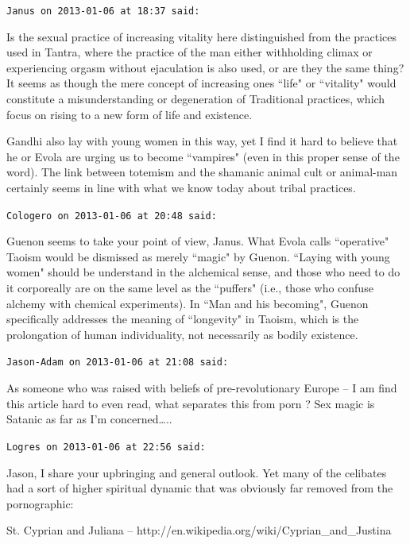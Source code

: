 \begin{footnotesize}\begin{sffamily}



\texttt{Janus on 2013-01-06 at 18:37 said: }

Is the sexual practice of increasing vitality here distinguished from the practices used in Tantra, where the practice of the man either withholding climax or experiencing orgasm without ejaculation is also used, or are they the same thing? It seems as though the mere concept of increasing ones ``life" or ``vitality" would constitute a misunderstanding or degeneration of Traditional practices, which focus on rising to a new form of life and existence. 

Gandhi also lay with young women in this way, yet I find it hard to believe that he or Evola are urging us to become ``vampires" (even in this proper sense of the word). The link between totemism and the shamanic animal cult or animal-man certainly seems in line with what we know today about tribal practices.


\hfill

\texttt{Cologero on 2013-01-06 at 20:48 said: }

Guenon seems to take your point of view, Janus. What Evola calls ``operative" Taoism would be dismissed as merely ``magic" by Guenon. ``Laying with young women" should be understand in the alchemical sense, and those who need to do it corporeally are on the same level as the ``puffers" (i.e., those who confuse alchemy with chemical experiments). In ``Man and his becoming", Guenon specifically addresses the meaning of ``longevity" in Taoism, which is the prolongation of human individuality, not necessarily as bodily existence.


\hfill

\texttt{Jason-Adam on 2013-01-06 at 21:08 said: }

As someone who was raised with beliefs of pre-revolutionary Europe – I am find this article hard to even read, what separates this from porn ? Sex magic is Satanic as far as I'm concerned…..


\hfill

\texttt{Logres on 2013-01-06 at 22:56 said: }

Jason, I share your upbringing and general outlook. Yet many of the celibates had a sort of higher spiritual dynamic that was obviously far removed from the pornographic:

St. Cyprian and Juliana – http://en.wikipedia.org/wiki/Cyprian\_and\_Justina


\end{sffamily}
\end{footnotesize}

